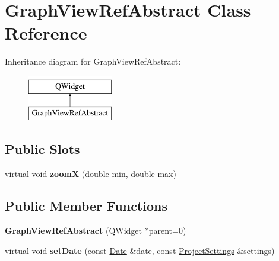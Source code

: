 \hypertarget{class_graph_view_ref_abstract}{\section{Graph\-View\-Ref\-Abstract Class Reference}
\label{class_graph_view_ref_abstract}
}
Inheritance diagram for Graph\-View\-Ref\-Abstract\-:\begin{figure}[H]
\begin{center}
\leavevmode
\includegraphics[height=2.000000cm]{class_graph_view_ref_abstract}
\end{center}
\end{figure}
\subsection*{Public Slots}
\begin{DoxyCompactItemize}
\item 
\hypertarget{class_graph_view_ref_abstract_ae90717674607146fbf17e435fa2db59d}{virtual void {\bfseries zoom\-X} (double min, double max)}\label{class_graph_view_ref_abstract_ae90717674607146fbf17e435fa2db59d}

\end{DoxyCompactItemize}
\subsection*{Public Member Functions}
\begin{DoxyCompactItemize}
\item 
\hypertarget{class_graph_view_ref_abstract_ac13908a99ed7665b64cde69594dd5190}{{\bfseries Graph\-View\-Ref\-Abstract} (Q\-Widget $\ast$parent=0)}\label{class_graph_view_ref_abstract_ac13908a99ed7665b64cde69594dd5190}

\item 
\hypertarget{class_graph_view_ref_abstract_a85788fb929e4c319d2c354e621f97123}{virtual void {\bfseries set\-Date} (const \hyperlink{class_date}{Date} \&date, const \hyperlink{class_project_settings}{Project\-Settings} \&settings)}\label{class_graph_view_ref_abstract_a85788fb929e4c319d2c354e621f97123}

\end{DoxyCompactItemize}
